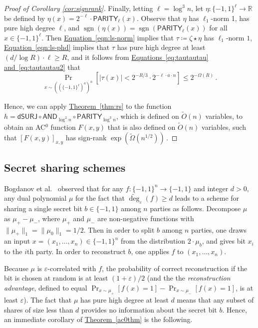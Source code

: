 \documentclass[11pt]{article}
\numberwithin{equation}{section}
\theoremstyle{definition}
\theoremstyle{plain}
\newcommand{\R}{\mathbb R}
\newcommand{\expref}[2]{\hyperref[#2]{#1~\ref{#2}}}
\newcommand{\expeqref}[2]{\hyperref[#2]{#1~\eqref{#2}}}
\newcommand{\sgn}{\mathrm{sign}}
\newcommand{\dumSURJ}{\mathsf{dSURJ}}
\newcommand{\bits}{\{-1,1\}}
\newcommand{\ls}{\star}
\newcommand{\eps}{\varepsilon}
\newcommand{\adeg}{\widetilde{\operatorname{deg}}}
\newcommand{\AND}{\mathsf{AND}}
\newcommand{\PARITY}{\mathsf{PARITY}}
\renewcommand{\sgn}{\operatorname{sgn}}
\begin{document}
\begin{proof}[Proof of Corollary \ref{cor:signrank}]
Finally, letting $\ell=\log^3 n$, let $\eta \colon \bits^{\ell} \to \R $ be defined by $\eta(x) = 2^{-\ell} \cdot \PARITY_{\ell}(x)$. 
Observe that $\eta$ has $\ell_1$-norm 1, has pure high degree $\ell$, and $\sgn(\eta(x))=\sgn(\PARITY_{\ell}(x))$ for all $x \in \bits^\ell$.
Then \expeqref{Equation}{eqn:ls-norm} implies that $\tau \coloneqq  \zeta \ls \eta$ has $\ell_1$-norm $1$, \expeqref{Equation}{eqn:ls-phd} implies that $\tau$ has pure high degree at least $(d/\log R) \cdot \ell \geq R$,
and it follows from \expeqref{Equations}{eq:tautautau} \expeqref{and}{eq:tautautau2} that 
\begin{equation}
\Pr_{x \sim \left(\left(\bits^{\ell}\right)^a\right)^n}[|\tau(x)| < 2^{-R/3} \cdot 2^{-\ell \cdot a \cdot n}] \leq 2^{-\Omega(R)}\,.
\end{equation}

Hence, we can apply \expref{Theorem}{thm:rs} to the function $h=\dumSURJ \circ \AND_{\log^2 n} \circ \PARITY_{\log^3 n}$, which is defined on $\tilde{O}(n)$
variables, to obtain an AC$^0$ function $F(x, y)$ that is also defined on $\tilde{O}(n)$ variables, such that $[F(x, y)]_{x, y}$ has sign-rank $\exp(\tilde{\Omega}(n^{1/2}))$\,.
\end{proof}





\subsection{Secret sharing schemes}
Bogdanov et al.~\cite{viola} observed that for any
$f \colon \bits^n \to \bits$ and integer $d>0$, any dual polynomial $\mu$
for the fact that $\adeg_{\eps}(f) \geq d$ leads to a scheme
for sharing a single secret bit $b \in \bits$ among $n$ parties as follows.
Decompose $\mu$ as $\mu_{+} - \mu_{-}$, where $\mu_{+}$ and $\mu_{-}$
are non-negative functions with $\|\mu_{+}\|_1 = \|\mu_{0}\|_1 = 1/2$. Then in order to split $b$
among $n$ parties,
one draws an input $x=(x_1, \dots, x_n) \in \bits^n$ from the distribution $2 \cdot \mu_b$, and
gives bit $x_i$ to the $i$th party.
In order to reconstruct $b$, one applies $f$ to $(x_1, \dots, x_n)$.

Because $\mu$ is $\eps$-correlated with $f$, the probability of correct reconstruction if the bit is 
chosen at random
is at least $(1+\eps)/2$ (and the the \emph{reconstruction advantage}, 
defined to equal $\Pr_{x \sim \mu_{+}}[f(x) = 1] - \Pr_{x\sim\mu_{-}}[f(x) = 1]$, is at least
$\eps$). 
The fact that $\mu$ has pure high degree at least $d$
means that any subset of shares of size less than $d$ provides no information 
about the secret bit $b$. 
Hence, an immediate corollary of \expref{Theorem}{ac0thm} is the following.
\end{document}
